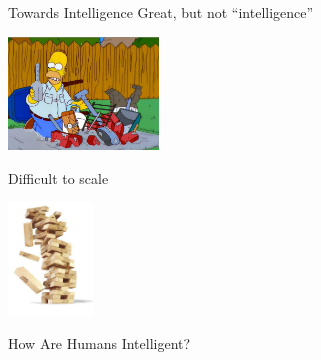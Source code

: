 %
%
%
\def\title{Towards Intelligence}
\begin{frame}[noframenumbering]{\title}
 Great, but not ``intelligence''
\begin{center}
\includegraphics[height=3cm]{../img/bbq.jpg}
\end{center}
\pause

 Difficult to scale
\begin{center}
\includegraphics[height=3cm]{../img/jenga.jpg}
\end{center}
\end{frame}

\def\title{How Are Humans Intelligent?}
\begin{frame}{\title}
\pause
\begin{center}
\end{center}
\pause
\vspace{3ex}

\begin{center}
\textbf{}
\end{center}
\end{frame}




